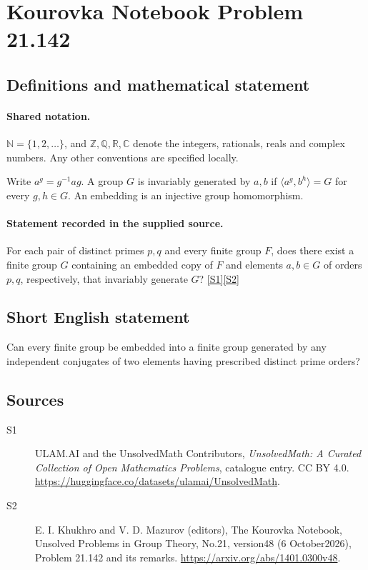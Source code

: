 \documentclass[11pt]{article}
\newcommand{\sref}[2]{\hyperlink{source:#1:#2}{[S#2]}}
\begin{document}
\section{Kourovka Notebook Problem 21.142}\label{statement}

\subsection{Definitions and mathematical statement}

\paragraph{Shared notation.}$\mathbb N=\{1,2,\ldots\}$, and $\mathbb Z,\mathbb Q,\mathbb R,\mathbb C$ denote the integers, rationals, reals and complex numbers. Any other conventions are specified locally.


Write $a^g=g^{-1}ag$. A group $G$ is invariably generated by $a,b$ if $\langle a^g,b^h\rangle=G$ for every $g,h\in G$. An embedding is an injective group homomorphism.
\paragraph{Statement recorded in the supplied source.}
For each pair of distinct primes $p,q$ and every finite group $F$, does there exist a finite group $G$ containing an embedded copy of $F$ and elements $a,b\in G$ of orders $p,q$, respectively, that invariably generate $G$? \sref{statement}{1}\sref{statement}{2}
\subsection{Short English statement}
Can every finite group be embedded into a finite group generated by any independent conjugates of two elements having prescribed distinct prime orders?
\subsection{Sources}
\begin{description}
\item[\hypertarget{source:statement:1}{S1}] ULAM.AI and the UnsolvedMath Contributors, \emph{UnsolvedMath: A Curated Collection of Open Mathematics Problems}, catalogue entry. CC BY 4.0. \url{https://huggingface.co/datasets/ulamai/UnsolvedMath}.
\item[\hypertarget{source:statement:2}{S2}] E. I. Khukhro and V. D. Mazurov (editors), The Kourovka Notebook, Unsolved Problems in Group Theory, No.21, version48 (6 October2026), Problem 21.142 and its remarks. \url{https://arxiv.org/abs/1401.0300v48}.
\end{description}
\label{end:statement}
\end{document}
